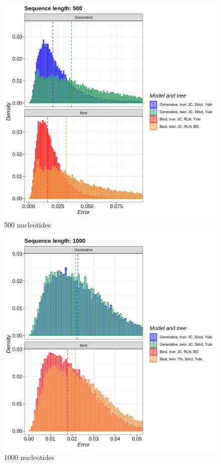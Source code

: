 \begin{figure}[H]
  \includegraphics[width=\textwidth]{pirouette_example_21/errors_500.png}
  \caption{500 nucleotides}
\end{figure}

\begin{figure}[H]
  \includegraphics[width=\textwidth]{pirouette_example_21/errors_1000.png}
  \caption{1000 nucleotides}
\end{figure}

